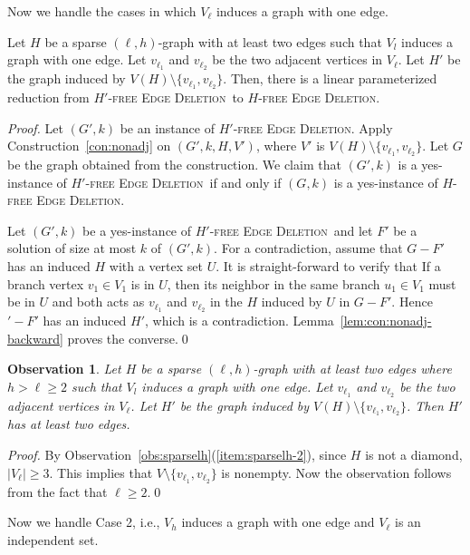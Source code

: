 \documentclass[envcountsame,envcountsect,10pt,oribibl]{llncs}
\newcommand{\pname}[1]{\textnormal{\textsc{#1}}}
\newcommand{\HED}{\pname{$H$-free Edge Deletion}}
\newcommand{\HDED}{\pname{$H'$-free Edge Deletion}}
\newtheorem{observation}[lemma]{Observation}
\begin{document}
Now we handle the cases in which $V_{\ell}$ induces a graph with one edge. 

\begin{lemma}
  \label{lem:sparselh-vl}
  Let $H$ be a sparse $(\ell,h)$-graph with at least two edges 
  such that $V_l$ induces a graph with one edge.
  Let $v_{\ell_1}$ and $v_{\ell_2}$ be the two adjacent vertices in $V_{\ell}$.
  Let $H'$ be the graph induced by $V(H)\setminus \{v_{\ell_1}, v_{\ell_2}\}$.
  Then, there is a linear parameterized reduction from \HDED\ to \HED.
\end{lemma}
\begin{proof}
  Let $(G',k)$ be an instance of \HDED. Apply Construction~\ref{con:nonadj}
  on $(G',k,H,V')$, where $V'$ is $V(H)\setminus \{v_{\ell_1}, v_{\ell_2}\}$.
  Let $G$ be the graph obtained from the construction. We claim that 
  $(G',k)$ is a yes-instance of \HDED\ if and only if $(G,k)$ is a 
  yes-instance of \HED.

  Let $(G',k)$ be a yes-instance of \HDED\ and let $F'$ be a solution of size
  at most $k$ of $(G',k)$. For a contradiction, assume that $G-F'$ has an induced
  $H$ with a vertex set $U$. It is straight-forward to verify that 
  If a branch vertex $v_1\in V_1$ is in $U$, then its neighbor in the same branch $u_1\in V_1$
  must be in $U$ and both acts as $v_{\ell_1}$ and $v_{\ell_2}$ in the $H$
  induced by $U$ in $G-F'$. Hence $'-F'$ has an induced $H'$, which is a contradiction.
  Lemma~\ref{lem:con:nonadj-backward} proves the converse.\qed
\end{proof}

\begin{observation}
  \label{obs:sparselh-vl}
  Let $H$ be a sparse $(\ell,h)$-graph with at least two edges where $h>\ell\geq 2$
  such that $V_l$ induces a graph with one edge.
  Let $v_{\ell_1}$ and $v_{\ell_2}$ be the two adjacent vertices in $V_{\ell}$.
  Let $H'$ be the graph induced by $V(H)\setminus \{v_{\ell_1}, v_{\ell_2}\}$.
  Then $H'$ has at least two edges.
\end{observation}
\begin{proof}
  By Observation~\ref{obs:sparselh}(\ref{item:sparselh-2}), since $H$ is not a diamond,
  $|V_{\ell}|\geq 3$. This implies that $V\setminus \{v_{\ell_1}, v_{\ell_2}\}$ is 
  nonempty. Now the observation follows from the fact that $\ell\geq 2$.\qed
\end{proof}

Now we handle Case 2, i.e., $V_h$ induces a graph with one edge and $V_{\ell}$
is an independent set.
\end{document}
